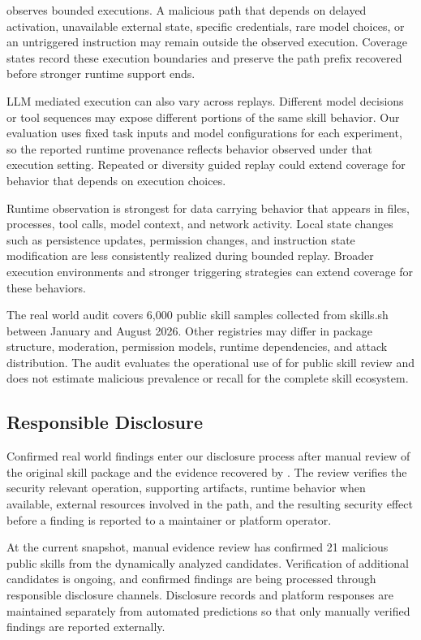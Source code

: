 \system observes bounded executions. A malicious path that depends on delayed
activation, unavailable external state, specific credentials, rare model
choices, or an untriggered instruction may remain outside the observed
execution. Coverage states record these execution boundaries and preserve the
path prefix recovered before stronger runtime support ends.

LLM mediated execution can also vary across replays. Different model decisions
or tool sequences may expose different portions of the same skill behavior.
Our evaluation uses fixed task inputs and model configurations for each
experiment, so the reported runtime provenance reflects behavior observed
under that execution setting. Repeated or diversity guided replay could extend
coverage for behavior that depends on execution choices.

Runtime observation is strongest for data carrying behavior that appears in
files, processes, tool calls, model context, and network activity. Local state
changes such as persistence updates, permission changes, and instruction state
modification are less consistently realized during bounded replay. Broader
execution environments and stronger triggering strategies can extend coverage
for these behaviors.

The real world audit covers 6,000 public skill samples collected from skills.sh
between January and August 2026. Other registries may differ in package
structure, moderation, permission models, runtime dependencies, and attack
distribution. The audit evaluates the operational use of \system for public
skill review and does not estimate malicious prevalence or recall for the
complete skill ecosystem.


\subsection{Responsible Disclosure}

Confirmed real world findings enter our disclosure process after manual review
of the original skill package and the evidence recovered by \system. The
review verifies the security relevant operation, supporting artifacts, runtime
behavior when available, external resources involved in the path, and the
resulting security effect before a finding is reported to a maintainer or
platform operator.

At the current snapshot, manual evidence review has confirmed 21 malicious
public skills from the dynamically analyzed candidates. Verification of
additional candidates is ongoing, and confirmed findings are being processed
through responsible disclosure channels. Disclosure records and platform
responses are maintained separately from automated predictions so that only
manually verified findings are reported externally.


